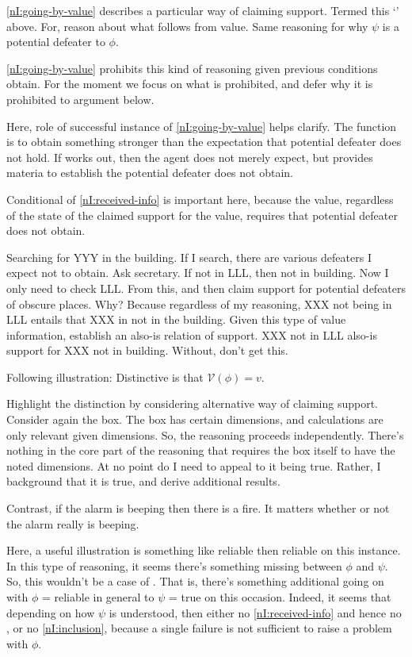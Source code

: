 \begin{note}[~\ref{nI:going-by-value}]
  \ref{nI:going-by-value} describes a particular way of claiming support.
  Termed this `\RBV{-}' above.
  For, reason about what follows from value.
  Same reasoning for why \(\psi\) is a potential defeater to \(\phi\).

  \ref{nI:going-by-value} prohibits this kind of reasoning given previous conditions obtain.
  For the moment we focus on what is prohibited, and defer why it is prohibited to argument below.

  Here, role of successful instance of \ref{nI:going-by-value} helps clarify.
  The function is to obtain something stronger than the expectation that potential defeater does not hold.
  If \RBV{} works out, then the agent does not merely expect, but provides materia to establish the potential defeater does not obtain.

  Conditional of \ref{nI:received-info} is important here, because the value, regardless of the state of the claimed support for the value, requires that potential defeater does not obtain.

  \begin{illustration}
    Searching for YYY in the building.
    If I search, there are various defeaters I expect not to obtain.
    Ask secretary.
    If not in LLL, then not in building.
    Now I only need to check LLL.
    From this, \RBV{} and then claim support for potential defeaters of obscure places.
    Why?
    Because regardless of my reasoning, XXX not being in LLL entails that XXX in not in the building.
    Given this type of value information, establish an also-is relation of support.
    XXX not in LLL also-is support for XXX not in building.
    Without, don't get this.
  \end{illustration}

  Following illustration:
  Distinctive is that \(\mathcal{V}(\phi) = v\).

  Highlight the distinction by considering alternative way of claiming support.
  Consider again the box.
  The box has certain dimensions, and calculations are only relevant given dimensions.
  So, the reasoning proceeds independently.
  There's nothing in the core part of the reasoning that requires the box itself to have the noted dimensions.
  At no point do I need to appeal to it being true.
  Rather, I background that it is true, and derive additional results.

  Contrast, if the alarm is beeping then there is a fire.
  It matters whether or not the alarm really is beeping.

  Here, a useful illustration is something like reliable then reliable on this instance.
  In this type of reasoning, it seems there's something missing between \(\phi\) and \(\psi\).
  So, this wouldn't be a case of \RBV{}.
  That is, there's something additional going on with \(\phi\) = reliable in general to \(\psi\) = true on this occasion.
  Indeed, it seems that depending on how \(\psi\) is understood, then either no \ref{nI:received-info} and hence no \RBV{}, or no \ref{nI:inclusion}, because a single failure is not sufficient to raise a problem with \(\phi\).
\end{note}

